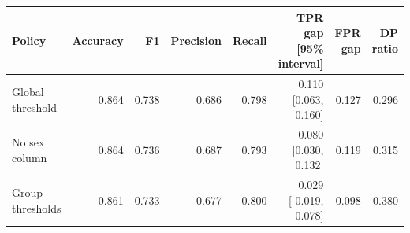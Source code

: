 \begin{tabular}{lrrrrrrr}
\toprule
Policy & Accuracy & F1 & Precision & Recall & TPR gap [95\% interval] & FPR gap & DP ratio \\
\midrule
Global threshold & 0.864 & 0.738 & 0.686 & 0.798 & 0.110 [0.063, 0.160] & 0.127 & 0.296 \\
No sex column & 0.864 & 0.736 & 0.687 & 0.793 & 0.080 [0.030, 0.132] & 0.119 & 0.315 \\
Group thresholds & 0.861 & 0.733 & 0.677 & 0.800 & 0.029 [-0.019, 0.078] & 0.098 & 0.380 \\
\bottomrule
\end{tabular}
